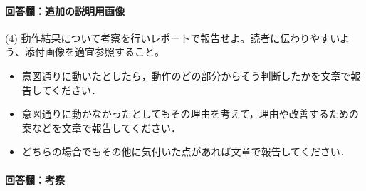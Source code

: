 \documentclass[12pt, xelatex,ja=standard,jafont=noto]{bxjsarticle}
\newif\ifdraft
\begin{document}
\paragraph{回答欄：追加の説明用画像}
\ifdraft
説明に必要な追加画像があれば貼り付ける
\fi

\begin{itembox}[l]{(4)}
動作結果について考察を行いレポートで報告せよ。読者に伝わりやすいよう、添付画像を適宜参照すること。
\begin{itemize}
    \item 意図通りに動いたとしたら，動作のどの部分からそう判断したかを文章で報告してください．
    \item 意図通りに動かなかったとしてもその理由を考えて，理由や改善するための案などを文章で報告してください．
    \item どちらの場合でもその他に気付いた点があれば文章で報告してください．
\end{itemize}
\end{itembox}

\paragraph{回答欄：考察}
\ifdraft
詳しい考察を記載する。
\fi
\end{document}
